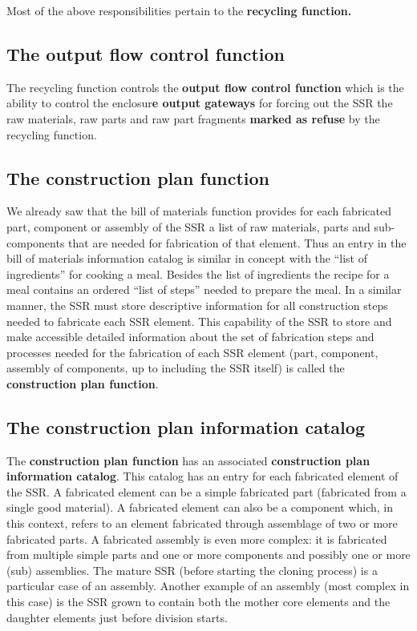 Most of the above responsibilities pertain to the \textbf{recycling
function.}

\subsection[The output flow control function]{The output flow control
function}

\hypertarget{RefHeading3082306210128}{}The recycling function controls
the \textbf{output flow control function }which is the ability to
control the enclosur\textbf{e output gateways }for forcing out the SSR
the raw materials, raw parts and raw part fragments \textbf{marked as
refuse} by the recycling function.

\subsection[The construction plan function]{The construction plan
function}

\hypertarget{RefHeading3084306210128}{}We already saw that the bill of
materials function provides for each fabricated part, component or
assembly of the SSR a list of raw materials, parts and sub-components
that are needed for fabrication of that element. Thus an entry in the
bill of materials information catalog is similar in concept with the
“list of ingredients” for cooking a meal. Besides the list of
ingredients the recipe for a meal contains an ordered “list of steps”
needed to prepare the meal. In a similar manner, the SSR must store
descriptive information for all construction steps needed to fabricate
each SSR element. This capability of the SSR to store and make
accessible detailed information about the set of fabrication steps and
processes needed for the fabrication of each SSR element (part,
component, assembly of components, up to including the SSR itself) is
called the \textbf{construction plan function}.

\subsection[The construction plan information catalog]{The construction
plan information catalog}

\hypertarget{RefHeading3086306210128}{}The \textbf{construction plan
function} has an associated \textbf{construction plan information
catalog}. This catalog has an entry for each fabricated element of the
SSR. A fabricated element can be a simple fabricated part (fabricated
from a single good material). A fabricated element can also be a
component which, in this context, refers to an element fabricated
through assemblage of two or more fabricated parts. A fabricated
assembly is even more complex: it is fabricated from multiple simple
parts and one or more components and possibly one or more (sub)
assemblies. The mature SSR (before starting the cloning process) is a
particular case of an assembly. Another example of an assembly (most
complex in this case) is the SSR grown to contain both the mother core
elements and the daughter elements just before division starts. 

